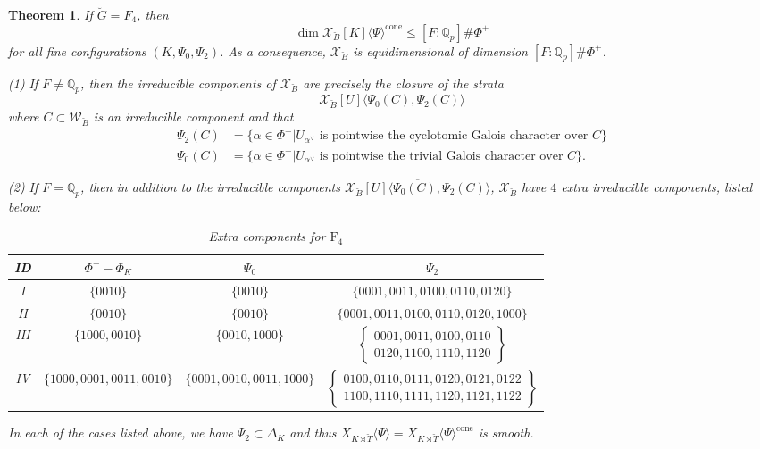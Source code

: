 \documentclass[11pt]{amsart}
\newcommand{\MINOREDITED}[1]{#1}
\newtheorem{thm}{Theorem}[section]
\theoremstyle{definition}
\newcommand{\Q}{\mathbb{Q}}
\newcommand{\cX}{\mathcal{X}}
\newcommand{\cW}{\mathcal{W}}
\newcommand{\bG}{\breve{G}}
\newcommand{\bB}{\breve{B}}
\newcommand{\bT}{\breve{T}}
\newcommand{\cone}{{\operatorname{cone}}}
\newcommand{\dF}{[F:\Q_p]}
\begin{document}
\begin{thm}
\rm
If $\bG=F_4$, then
\[
\dim \cX_{\bB}[K]\langle\Psi\rangle^\cone\le
\dF\MINOREDITED{\#}\Phi^+
\]
for all fine configurations $(K,\Psi_0,\Psi_2)$.
As a consequence, $\cX_{\bB}$ is equidimensional
of dimension $\dF\MINOREDITED{\#}\Phi^+$.

(1)
If $F\neq \Q_p$,
then the irreducible components
of  $\cX_{\bB}$ are precisely the closure
of the strata
\[
\cX_{\bB}[U]\langle \Psi_0(C), \Psi_2(C)\rangle
\]
where $C\subset \cW_{\bB}$ is an irreducible component
and that
\begin{align*}
\Psi_2(C) &= \{\alpha\in\Phi^+| 
U_{\alpha^\vee}\text{~is pointwise the cyclotomic Galois character
over $C$}\}\\
\Psi_0(C) &= \{\alpha\in\Phi^+| 
U_{\alpha^\vee}\text{~is pointwise the trivial Galois character
over $C$}\}.
\end{align*}

(2)
If $F=\Q_p$,
then in addition to the irreducible components
$\overline{\cX_{\bB}[U]\langle \Psi_0(C), \Psi_2(C)\rangle}$,
$\cX_{\bB}$ have $4$ extra irreducible components,
listed below:

\begin{table}[H]
\centering
\scriptsize
\begin{tabular}{|c|c|c|c|}
\hline
ID & $\Phi^+-\Phi_K$ & $\Psi_0$ & $\Psi_2$ \\
\hline
I & $\{0010\}$ & $\{0010\}$ & $\{0001,0011,0100,0110,0120\}$ \\
II & $\{0010\}$ & $\{0010\}$ & $\{0001,0011,0100,0110,0120,1000\}$ \\
III & $\{1000,0010\}$ & $\{0010,1000\}$ & $\left\{ \begin{matrix} 0001,0011,0100,0110 \\ 0120,1100,1110,1120 \end{matrix} \right\}$ \\
IV & $\{1000,0001,0011,0010\}$ & $\{0001,0010,0011,1000\}$ & $\left\{ \begin{matrix} 0100,0110,0111,0120,0121,0122 \\ 1100,1110,1111,1120,1121,1122 \end{matrix} \right\}$ \\
\hline
\end{tabular}
\caption{Extra components for $\mathrm{F}_4$}
\label{table:F4-table}
\end{table}
In each of the cases listed above,
we have
$\Psi_2\subset \Delta_K$
and thus
$X_{K\rtimes \bT}\langle\Psi\rangle
=X_{K\rtimes \bT}\langle\Psi\rangle^\cone$
is smooth.
\label{thm:F4-table}
\end{thm}
\end{document}
